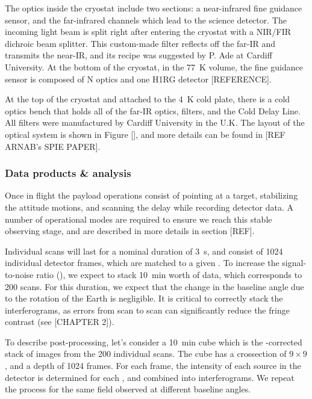 The optics inside the cryostat include two sections: a near-infrared fine guidance sensor, and the far-infrared channels which lead to the science detector. The incoming light beam is split right after entering the cryostat with a NIR/FIR dichroic beam splitter. This custom-made filter reflects off the far-IR and transmits the near-IR, and its recipe was suggested by P. Ade at Cardiff University. At the bottom of the cryostat, in the \SI{77}{\kelvin} volume, the fine guidance sensor is composed of N optics and one H1RG detector [REFERENCE]. 

At the top of the cryostat and attached to the \SI{4}{\kelvin} cold plate, there is a cold optics bench that holds all of the far-IR optics, filters, and the Cold Delay Line. All filters were manufactured by Cardiff University in the U.K. The layout of the optical system is shown in Figure [], and more details can be found in [REF ARNAB's SPIE PAPER].



\subsubsection{Data products \& analysis}


Once in flight the payload operations consist of pointing at a target, stabilizing the attitude motions, and scanning the delay while recording detector data. A number of operational modes are required to ensure we reach this stable observing stage, and are described in more details in section [REF]. 

Individual scans will last for a nominal duration of \SI{3}{\second}, and consist of \si{1024} individual detector frames, which are matched to a given \OPD. To increase the signal-to-noise ratio (\SNR), we expect to stack \SI{10}{\minute} worth of data, which corresponds to 200 scans. For this duration, we expect that the change in the baseline angle due to the rotation of the Earth is negligible. It is critical to correctly stack the interferograms, as \OPD errors from scan to scan can significantly reduce the fringe contrast (see [CHAPTER 2]).

To describe post-processing, let's consider a \SI{10}{\minute} cube which is the {\OPD}-corrected stack of images from the 200 individual scans. The cube has a crossection of $9\times 9$, and a depth of 1024 frames. For each frame, the intensity of each source in the detector is determined for each \OPD, and combined into interferograms. We repeat the process for the same field observed at different baseline angles. 

